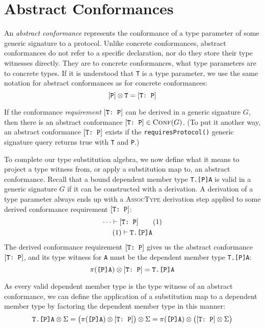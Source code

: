 \documentclass[../generics]{subfiles}
\begin{document}
\section{Abstract Conformances}\label{abstract conformances}

An \emph{abstract conformance} represents the conformance of a type parameter of some generic signature to a protocol. Unlike concrete conformances, abstract conformances do not refer to a specific declaration, nor do they store their type witnesses directly. They are to concrete conformances, what type parameters are to concrete types. If it is understood that \texttt{T} is a type parameter, we use the same notation for abstract conformances as for concrete conformances:
\[[\texttt{P}]\otimes\texttt{T} = [\texttt{T:~P}]\]

If the conformance \emph{requirement} $[\texttt{T:~P}]$ can be derived in a generic signature $G$, then there is an abstract conformance $[\texttt{T:~P}]\in\textsc{Conf}({G})$. (To put it another way, an abstract conformance $[\texttt{T:~P}]$ exists if the \texttt{requiresProtocol()} generic signature query returns true with \texttt{T} and \texttt{P}.)

To complete our type substitution algebra, we now define what it means to project a type witness from, or apply a substitution map to, an abstract conformance. Recall that a bound dependent member type \texttt{T.[P]A} is valid in a generic signature $G$ if it can be constructed with a derivation. A derivation of a type parameter always ends up with a \textsc{AssocType} derivation step applied to some derived conformance requirement $[\texttt{T:~P}]$:
\begin{gather*}
\cdots\vdash[\texttt{T:~P}]\tag{1}\\
(1)\vdash\texttt{T.[P]A}
\end{gather*}
The derived conformance requirement $[\texttt{T:~P}]$ gives us the abstract conformance $[\texttt{T:~P}]$, and its type witness for \texttt{A} must be the dependent member type \texttt{T.[P]A}:
\[\pi(\texttt{[P]A}) \otimes [\texttt{T:~P}] = \texttt{T.[P]A}\]

As every valid dependent member type is the type witness of an abstract conformance, we can define the application of a substitution map to a dependent member type by factoring the dependent member type in this manner:
\[\texttt{T.[P]A}\otimes\Sigma=\bigl(\pi(\texttt{[P]A}) \otimes [\texttt{T:~P}]\bigr)\otimes\Sigma=\pi(\texttt{[P]A})\otimes\bigl([\texttt{T:~P}]\otimes\Sigma\bigr)\]
\end{document}
